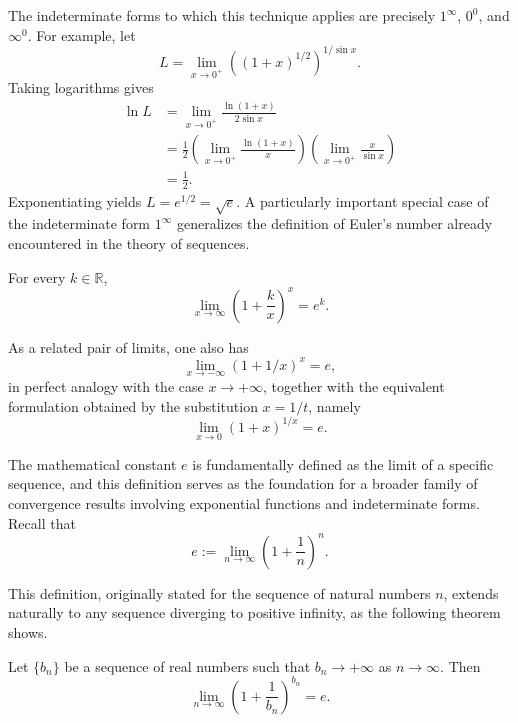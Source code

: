 The indeterminate forms to which this technique applies are precisely $1^\infty$, $0^0$, and $\infty^0$. For example, let
\[
L=\lim_{x \to 0^+} ((1+x)^{1/2})^{1/\sin x}.
\]
Taking logarithms gives
\[
\begin{aligned}
\ln L
&=\lim_{x\to0^+}\frac{\ln(1+x)}{2\sin x}\\
&=\frac12\left(\lim_{x\to0^+}\frac{\ln(1+x)}{x}\right)
\left(\lim_{x\to0^+}\frac{x}{\sin x}\right)\\
&=\frac12.
\end{aligned}
\]
Exponentiating yields $L=e^{1/2}=\sqrt e$. A particularly important special case of the indeterminate form $1^\infty$ generalizes the definition of Euler's number already encountered in the theory of sequences.

\begin{theorem}
For every $k \in \mathbb{R}$,
\[
\lim_{x \to \infty} \left( 1 + \frac{k}{x} \right)^x = e^k.
\]

\end{theorem}

As a related pair of limits, one also has \[
\lim_{x \to -\infty} (1 + 1/x)^x = e,
\] in perfect analogy with the case $x \to +\infty$, together with the equivalent formulation obtained by the substitution $x = 1/t$, namely
\[
\lim_{x \to 0} (1+x)^{1/x} = e.
\]

The mathematical constant $e$ is fundamentally defined as the limit of a specific sequence, and this definition serves as the foundation for a broader family of convergence results involving exponential functions and indeterminate forms. Recall that
\[
e := \lim_{n \to \infty} \left( 1 + \frac{1}{n} \right)^n.
\]

This definition, originally stated for the sequence of natural numbers $n$, extends naturally to any sequence diverging to positive infinity, as the following theorem shows.

\begin{theorem}
Let $\{b_n\}$ be a sequence of real numbers such that $b_n \to +\infty$ as $n \to \infty$. Then
\[
\lim_{n \to \infty} \left( 1 + \frac{1}{b_n} \right)^{b_n} = e.
\]

\end{theorem}

